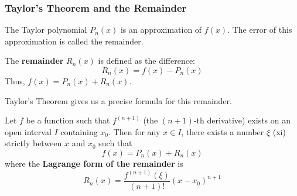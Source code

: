 \subsubsection{Taylor's Theorem and the Remainder}

The Taylor polynomial $P_n(x)$ is an approximation of $f(x)$. The error of this approximation is called the remainder.

\begin{definition}[Remainder]
The \textbf{remainder} $R_n(x)$ is defined as the difference:
\[
R_n(x) = f(x) - P_n(x)
\]
Thus, $f(x) = P_n(x) + R_n(x)$.
\end{definition}

Taylor's Theorem gives us a precise formula for this remainder.



\begin{theorem}
\label{thm:taylor_en}
Let $f$ be a function such that $f^{(n+1)}$ (the $(n+1)$-th derivative) exists on an open interval $I$ containing $x_0$.
Then for any $x \in I$, there exists a number $\xi$ (xi) strictly between $x$ and $x_0$ such that
\[
f(x) = P_n(x) + R_n(x)
\]
where the \textbf{Lagrange form of the remainder} is
\[
R_n(x) = \frac{f^{(n+1)}(\xi)}{(n+1)!} (x-x_0)^{n+1}
\]
\end{theorem}

